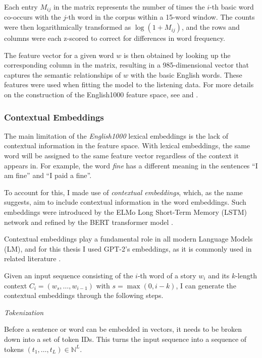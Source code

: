 \documentclass[a4paper]{article}
\begin{document}
Each entry $M_{ij}$ in the matrix represents the number of times the $i$-th basic word co-occurs with the $j$-th word in the corpus within a 15-word window. The counts were then logarithmically transformed as $\log(1 + M_{ij})$, and the rows and columns were each z-scored to correct for differences in word frequency. 

The feature vector for a given word $w$ is then obtained by looking up the corresponding column in the matrix, resulting in a 985-dimensional vector that captures the semantic relationships of $w$ with the basic English words. These features were used when fitting the model to the listening data. For more details on the construction of the English1000 feature space, see \textcite{deniz_representation_2019} and \textcite{huth_natural_2016}.

\subsubsection*{Contextual Embeddings}
 
The main limitation of the \textit{English1000} lexical embeddings is the lack of contextual information in the feature space. With lexical embeddings, the same word will be assigned to the same feature vector regardless of the context it appears in. For example, the word \textit{fine} has a different meaning in the sentences ``I am fine'' and ``I paid a fine''.
 
To account for this, I made use of \textit{contextual embeddings}, which, as the name suggests, aim to include contextual information in the word embeddings. Such embeddings were introduced by the ELMo Long Short-Term Memory (LSTM) network \parencite{peters_deep_2018} and refined by the BERT transformer model \parencite{devlin_bert_2019}.
 
Contextual embeddings play a fundamental role in all modern Language Models (LM), and for this thesis I used GPT-2's embeddings, as it is commonly used in related literature \parencite{schrimpf_neural_2021, tuckute_driving_2024}.
 
Given an input sequence consisting of the $i$-th word of a story $w_{i}$ and its $k$-length context $C_{i} = (w_s, \ldots, w_{i-1})$ with $s = \max(0, i-k)$, I can generate the contextual embeddings through the following steps.
 
\textit{Tokenization}
 
Before a sentence or word can be embedded in vectors, it needs to be broken down into a set of token IDs. This turns the input sequence into a sequence of tokens $(t_1, \ldots, t_L) \in \mathbb{N}^L$.
 
\end{document}
